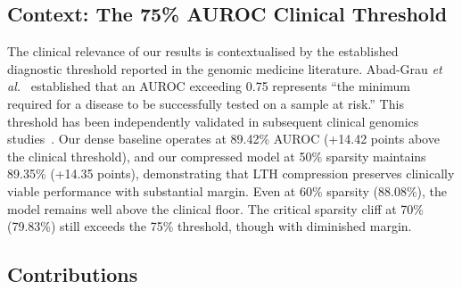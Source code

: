 \documentclass[journal]{IEEEtran}
\begin{document}
\subsection{Context: The 75\% AUROC Clinical Threshold}

The clinical relevance of our results is contextualised by
the established diagnostic threshold reported in the
genomic medicine literature.
Abad-Grau \emph{et al.}~\cite{Abad-Grau2016} established that
an AUROC exceeding 0.75 represents ``the minimum required for
a disease to be successfully tested on a sample at risk.''
This threshold has been independently validated in subsequent
clinical genomics studies~\cite{Mandrekar2010,Hosmer2013}.
Our dense baseline operates at 89.42\% AUROC
(+14.42 points above the clinical threshold), and our
compressed model at 50\% sparsity maintains 89.35\%
(+14.35 points), demonstrating that LTH compression
preserves clinically viable performance with substantial
margin.
Even at 60\% sparsity (88.08\%), the model remains well above
the clinical floor.
The critical sparsity cliff at 70\% (79.83\%) still exceeds
the 75\% threshold, though with diminished margin.

\subsection{Contributions}
\end{document}
